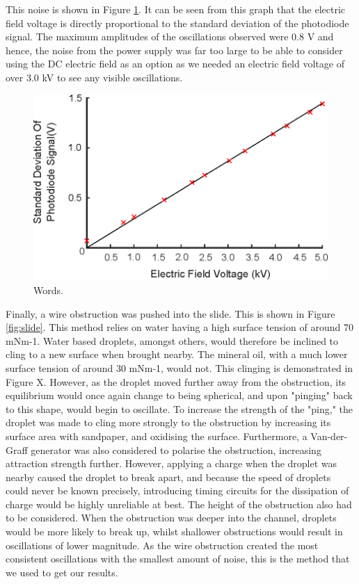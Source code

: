 \documentclass{physics_article_B}
\begin{document}
        This noise is shown in Figure \ref{fig:control}. It can be seen from this graph that the electric field voltage is directly proportional to the standard deviation of the photodiode signal. The maximum amplitudes of the oscillations observed were 0.8 V and hence, the noise from the power supply was far too large to be able to consider using the DC electric field as an option as we needed an electric field voltage of over 3.0 kV to see any visible oscillations. 
        
        
\begin{figure}[H]
\centering
\includegraphics{Figures/ElecFieldNoise.eps}
\captionsetup{justification=centering}
\caption{Words.} 	
\label{fig:control}
\end{figure} 
        
        Finally, a wire obstruction was pushed into the slide. This is shown in Figure \ref{fig:slide}. This method relies on water having a high surface tension of around 70 mNm-1. Water based droplets, amongst others, would therefore be inclined to cling to a new surface when brought nearby. The mineral oil, with a much lower surface tension of around 30 mNm-1, would not. This clinging is demonstrated in Figure X. However, as the droplet moved further away from the obstruction, its equilibrium would once again change to being spherical, and upon "pinging" back to this shape, would begin to oscillate. To increase the strength of the "ping," the droplet was made to cling more strongly to the obstruction by increasing its surface area with sandpaper, and oxidising the surface. Furthermore, a Van-der-Graff generator was also considered to polarise the obstruction, increasing attraction strength further. However, applying a charge when the droplet was nearby caused the droplet to break apart, and because the speed of droplets could never be known precisely, introducing timing circuits for the dissipation of charge would be highly unreliable at best. The height of the obstruction also had to be considered. When the obstruction was deeper into the channel, droplets would be more likely to break up, whilst shallower obstructions would result in oscillations of lower magnitude. As the wire obstruction created the most consistent oscillations with the smallest amount of noise, this is the method that we used to get our results.
 
\end{document}
